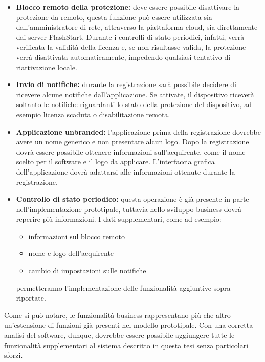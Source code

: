 \documentclass[12pt,a4paper,openright,twoside]{book}
\begin{document}
\begin{itemize}
	
	\item \textbf{Blocco remoto della protezione:}
	deve essere possibile disattivare la protezione da remoto, questa funzione può essere utilizzata sia dall'amministratore di rete, attraverso la piattaforma cloud, sia direttamente dai server FlashStart.
	Durante i controlli di stato periodici, infatti, verrà verificata la validità della licenza e, se non risultasse valida, la protezione verrà disattivata automaticamente, impedendo qualsiasi tentativo di riattivazione locale.
	
	\item \textbf{Invio di notifiche:}
	durante la registrazione sarà possibile decidere di ricevere alcune notifiche dall'applicazione.
	Se attivate, il dispositivo riceverà soltanto le notifiche riguardanti lo stato della protezione del dispositivo, ad esempio licenza scaduta o disabilitazione remota.
	
	\item \textbf{Applicazione unbranded:}
	l'applicazione prima della registrazione dovrebbe avere un nome generico e non presentare alcun logo.
	Dopo la registrazione dovrà essere possibile ottenere informazioni sull'acquirente, come il nome scelto per il software e il logo da applicare.
	L'interfaccia grafica dell'applicazione dovrà adattarsi alle informazioni ottenute durante la registrazione.
	
	\item \textbf{Controllo di stato periodico:}
	questa operazione è già presente in parte nell'implementazione prototipale, tuttavia nello sviluppo business dovrà reperire più informazioni.
	I dati supplementari, come ad esempio:
	\begin{itemize}
		\item informazioni sul blocco remoto
		\item nome e logo dell'acquirente
		\item cambio di impostazioni sulle notifiche
	\end{itemize}
	permetteranno l'implementazione delle funzionalità aggiuntive sopra riportate.

\end{itemize}
Come si può notare, le funzionalità business rappresentano più che altro un'estensione di funzioni già presenti nel modello prototipale.
Con una corretta analisi del software, dunque, dovrebbe essere possibile aggiungere tutte le funzionalità supplementari al sistema descritto in questa tesi senza particolari sforzi.
\end{document}
